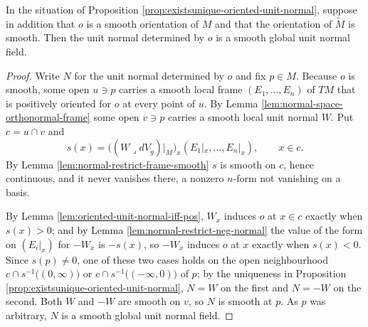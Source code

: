 \begin{proposition}
\label{prop:unit-normal-of-orientation-smooth}
\leanok
{}
In the situation of Proposition \ref{prop:existsunique-oriented-unit-normal}, suppose in addition
that $o$ is a smooth orientation of $M$ and that the orientation of $\tilde M$ is smooth. Then the
unit normal determined by $o$ is a smooth global unit normal field.
\end{proposition}

\begin{proof}
\leanok
{}
Write $N$ for the unit normal determined by $o$ and fix $p \in M$. Because $o$ is smooth, some
open $u \ni p$ carries a smooth local frame $(E_1, \ldots, E_n)$ of $TM$ that is positively
oriented for $o$ at every point of $u$. By Lemma \ref{lem:normal-space-orthonormal-frame} some
open $v \ni p$ carries a smooth local unit normal $W$. Put $c = u \cap v$ and
\[
  s(x) = \bigl((W \lrcorner dV_{\tilde g})|_M\bigr)_x(E_1|_x, \ldots, E_n|_x), \qquad x \in c .
\]
By Lemma \ref{lem:normal-restrict-frame-smooth} $s$ is smooth on $c$, hence continuous, and it
never vanishes there, a nonzero $n$-form not vanishing on a basis.

By Lemma \ref{lem:oriented-unit-normal-iff-pos}, $W_x$ induces $o$ at $x \in c$ exactly when
$s(x) > 0$; and by Lemma \ref{lem:normal-restrict-neg-normal} the value of the form on $(E_i|_x)$
for $-W_x$ is $-s(x)$, so $-W_x$ induces $o$ at $x$ exactly when $s(x) < 0$. Since $s(p) \neq 0$,
one of these two cases holds on the open neighbourhood $c \cap s^{-1}\bigl((0,\infty)\bigr)$ or
$c \cap s^{-1}\bigl((-\infty,0)\bigr)$ of $p$; by the uniqueness in Proposition
\ref{prop:existsunique-oriented-unit-normal}, $N = W$ on the first and $N = -W$ on the second.
Both $W$ and $-W$ are smooth on $v$, so $N$ is smooth at $p$. As $p$ was arbitrary, $N$ is a
smooth global unit normal field.
\end{proof}

